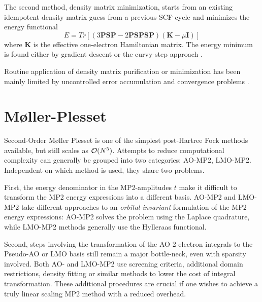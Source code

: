 The second method, density matrix minimization, starts from an existing idempotent density matrix guess from a previous SCF cycle and minimizes the energy functional \cite{Li1993,Daw1993,Nun1994}
\begin{equation}
E = Tr\left[ \left(3\mathbf{PSP} - 2\mathbf{PSPSP}\right)\left(\mathbf{K} - \mu \mathbf{I}\right) \right]
\end{equation}
\noindent where $\mathbf{K}$ is the effective one-electron Hamiltonian matrix. The energy minimum is found either by gradient descent or the curvy-step approach \cite{Hel2000,Sha2003}.

Routine application of density matrix purification or minimization has been mainly limited by uncontrolled error accumulation and convergence problems \cite{Rub2008}.


\section{M{\o}ller-Plesset}

Second-Order M{\o}ller Plesset is one of the simplest post-Hartree Fock methods available, but still scales as $\mathcal{O}(N^{5})$. Attempts to reduce computational complexity can generally be grouped into two categories: AO-MP2, LMO-MP2. Independent on which method is used, they share two problems. 

First, the energy denominator in the MP2-amplitudes $t$ make it difficult to transform the MP2 energy expressions into a different basis. AO-MP2 and LMO-MP2 take different approaches to an \emph{orbital-invariant} formulation of the MP2 energy expressions: AO-MP2 solves the problem using the Laplace quadrature, while LMO-MP2 methods generally use the Hylleraas functional. %

Second, steps involving the transformation of the AO 2-electron integrals to the Pseudo-AO or LMO basis still remain a major bottle-neck, even with sparsity involved. Both AO- and LMO-MP2 use screening criteria, additional domain restrictions, density fitting or similar methods to lower the cost of integral transformation. These additional procedures are crucial if one wishes to achieve a truly linear scaling MP2 method with a reduced overhead. 

